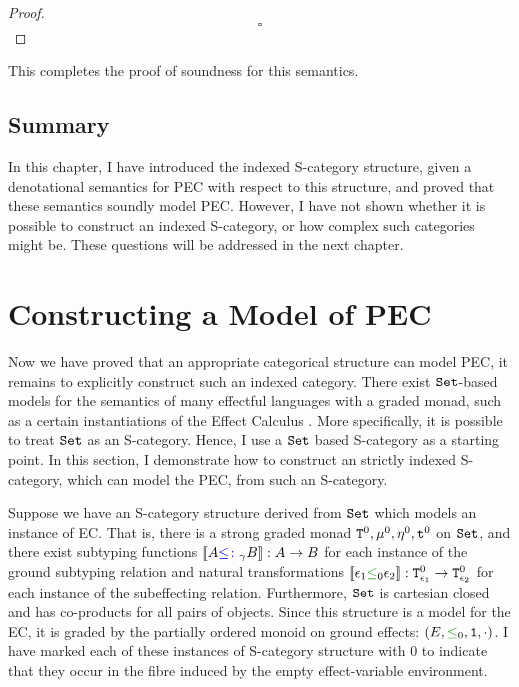 \documentclass{Report}
\begin{document}
\begin{framed}
\begin{proof}
    
        $$\square$$
    
    \end{proof}
    
\end{framed}

This completes the proof of soundness for this semantics.

\section{Summary}

In this chapter, I have introduced the indexed S-category structure, given a denotational semantics for PEC with respect to this structure, and proved that these semantics soundly model PEC. However, I have not shown whether it is possible to construct an indexed S-category, or how complex such categories might be. These questions will be addressed in the next chapter.

\chapter{Constructing a Model of PEC}
\label{HowToBuildAModel}

Now we have proved that an appropriate categorical structure can model PEC, it remains to explicitly construct such an indexed category. There exist $\texttt{Set}$-based models for the semantics of many effectful languages with a graded monad, such as a certain instantiations of the Effect Calculus \cite{Katsumata:2014}. More specifically, it is possible to treat $\texttt{Set}$ as an S-category. Hence, I use a $\texttt{Set}$ based S-category as a starting point. In this section, I  demonstrate how to construct an strictly indexed S-category, which can model the PEC, from such an S-category.

Suppose we have an S-category structure derived from $\texttt{Set}$ which models an instance of EC. That is, there is a strong graded monad $\texttt{T}^0_{}, \mu^0, \eta_{}^0, \texttt{t}^0$ on $\texttt{Set}$, and there exist subtyping functions ${\bf [\![}A{\color{blue} \leq\colon}_\gamma B{\bf ]\!]}: A \rightarrow B$ for each instance of the ground subtyping relation and natural transformations $\deno{\e_1 \subeffectz \e_2}: \Tz{\e_1}{} \rightarrow \Tz{\e_2}{}$ for each instance of the subeffecting relation. Furthermore, $\texttt{Set}$ is cartesian closed and has co-products for all pairs of objects. Since this structure is a model for the EC, it is graded by the partially ordered monoid on ground effects: $(E, \subeffectz, \1, \dot)$. I have marked each of these instances of S-category structure with $0$ to indicate that they occur in the fibre induced by the empty effect-variable environment.
\end{document}
